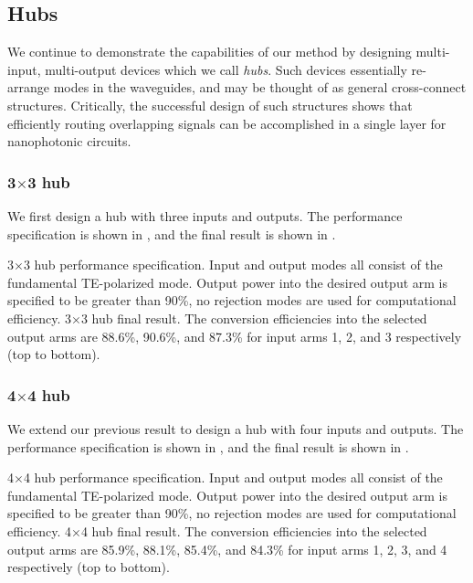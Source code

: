 \documentclass[letterpaper,10pt]{article}
\begin{document}
\subsection{Hubs}
We continue to demonstrate the capabilities of our method
    by designing multi-input, multi-output devices which we call \emph{hubs}.
Such devices essentially re-arrange modes in the waveguides,
    and may be thought of as general cross-connect structures.
Critically, the successful design of such structures 
    shows that efficiently routing overlapping signals can be 
    accomplished in a single layer for nanophotonic circuits.

\subsubsection{3$\times$3 hub}
We first design a hub with three inputs and outputs.
The performance specification is shown in ,
    and the final result is shown in .

    {3$\times$3 hub performance specification.
    Input and output modes all consist of the fundamental TE-polarized mode.
    Output power into the desired output arm is specified to be greater than 90\%,
        no rejection modes are used for computational efficiency.}
    {3$\times$3 hub final result.
    The conversion efficiencies into the selected output arms
        are 88.6\%, 90.6\%, and 87.3\% for 
        input arms 1, 2, and 3 respectively (top to bottom).}

\subsubsection{4$\times$4 hub}
We extend our previous result to design a hub with four inputs and outputs.
The performance specification is shown in ,
    and the final result is shown in .

    {4$\times$4 hub performance specification.
    Input and output modes all consist of the fundamental TE-polarized mode.
    Output power into the desired output arm is specified to be greater than 90\%,
        no rejection modes are used for computational efficiency.}
    {4$\times$4 hub final result.
    The conversion efficiencies into the selected output arms
        are 85.9\%, 88.1\%, 85.4\%, and 84.3\% for
        input arms 1, 2, 3, and 4 respectively (top to bottom).}
\end{document}
